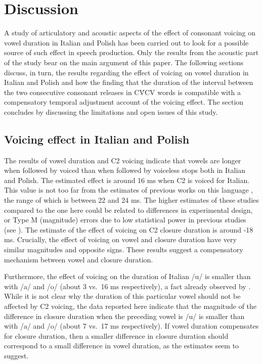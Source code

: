 \documentclass[charis]{glossa}
\begin{document}
\hypertarget{discussion}{%
\section{Discussion}\label{discussion}}

\label{s:discussion}

A study of articulatory and acoustic aspects of the effect of consonant
voicing on vowel duration in Italian and Polish has been carried out to
look for a possible source of such effect in speech production. Only the
results from the acoustic part of the study bear on the main argument of
this paper. The following sections discuss, in turn, the results
regarding the effect of voicing on vowel duration in Italian and Polish
and how the finding that the duration of the interval between the two
consecutive consonant releases in CV́CV words is compatible with a
compensatory temporal adjustment account of the voicing effect. The
section concludes by discussing the limitations and open issues of this
study.

\hypertarget{voicing-effect-in-italian-and-polish}{%
\subsection{Voicing effect in Italian and
Polish}\label{voicing-effect-in-italian-and-polish}}

The results of vowel duration and C2 voicing indicate that vowels are
longer when followed by voiced than when followed by voiceless stops
both in Italian and Polish. The estimated effect is around 16 ms when C2
is voiced for Italian. This value is not too far from the estimates of
previous works on this language
\citep{caldognetto1979, farnetani1986, esposito2002}, the range of which
is between 22 and 24 ms. The higher estimates of these studies compared
to the one here could be related to differences in experimental design,
or Type M (magnitude) errors due to low statistical power in previous
studies (see \citealt{kirby2018}). The estimate of the effect of voicing
on C2 closure duration is around -18 ms. Crucially, the effect of
voicing on vowel and closure duration have very similar magnitudes and
opposite signs. These results suggest a compensatory mechanism between
vowel and closure duration.

Furthermore, the effect of voicing on the duration of Italian /u/ is
smaller than with /a/ and /o/ (about 3 vs.~16 ms respectively), a fact
already observed by \citealt{ferrero1978}. While it is not clear why the
duration of this particular vowel should not be affected by C2 voicing,
the data reported here indicate that the magnitude of the difference in
closure duration when the preceding vowel is /u/ is smaller than with
/a/ and /o/ (about 7 vs.~17 ms respectively). If vowel duration
compensates for closure duration, then a smaller difference in closure
duration should correspond to a small difference in vowel duration, as
the estimates seem to suggest.
\end{document}
